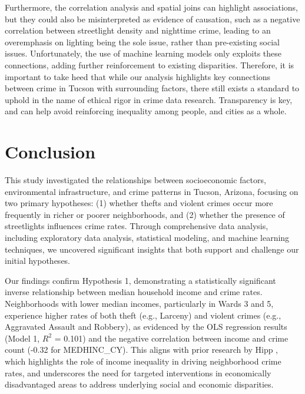 \documentclass{report}
\begin{document}
\par Furthermore, the correlation analysis and spatial joins can highlight associations, but they could also be misinterpreted as evidence of causation, such as a negative correlation between streetlight density and nighttime crime, leading to an overemphasis on lighting being the sole issue, rather than pre-existing social issues. Unfortunately, the use of machine learning models only exploits these connections, adding further reinforcement to existing disparities. Therefore, it is important to take heed that while our analysis highlights key connections between crime in Tucson with surrounding factors, there still exists a standard to uphold in the name of ethical rigor in crime data research. Transparency is key, and can help avoid reinforcing inequality among people, and cities as a whole.

\chapter{Conclusion}

\par This study investigated the relationships between socioeconomic factors, environmental infrastructure, and crime patterns in Tucson, Arizona, focusing on two primary hypotheses: (1) whether thefts and violent crimes occur more frequently in richer or poorer neighborhoods, and (2) whether the presence of streetlights influences crime rates. Through comprehensive data analysis, including exploratory data analysis, statistical modeling, and machine learning techniques, we uncovered significant insights that both support and challenge our initial hypotheses.

\par Our findings confirm Hypothesis 1, demonstrating a statistically significant inverse relationship between median household income and crime rates. Neighborhoods with lower median incomes, particularly in Wards 3 and 5, experience higher rates of both theft (e.g., Larceny) and violent crimes (e.g., Aggravated Assault and Robbery), as evidenced by the OLS regression results (Model 1, $R^2$ = 0.101) and the negative correlation between income and crime count (-0.32 for MEDHINC\_CY). This aligns with prior research by Hipp \cite{jr07}, which highlights the role of income inequality in driving neighborhood crime rates, and underscores the need for targeted interventions in economically disadvantaged areas to address underlying social and economic disparities.
\end{document}
